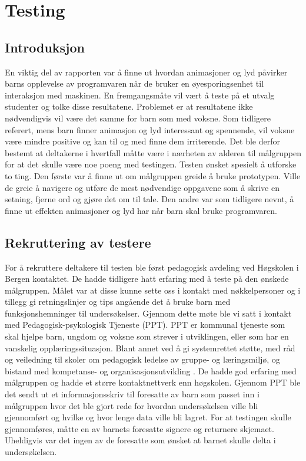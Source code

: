  
 
\chapter{Testing} 
 
\section{Introduksjon} 
 
En viktig del av rapporten var å finne ut hvordan animasjoner og lyd påvirker barns opplevelse av programvaren når de bruker en øyesporingsenhet til interaksjon med maskinen. En fremgangsmåte vil vært å teste på et utvalg studenter og tolke disse resultatene. Problemet er at resultatene ikke nødvendigvis vil være det samme for barn som med voksne. Som tidligere referert, mens barn finner animasjon og lyd interessant og spennende, vil voksne være mindre positive og kan til og med finne dem irriterende. Det ble derfor bestemt at deltakerne i  hvertfall måtte være i nærheten av alderen til målgruppen for at det skulle være noe poeng med testingen. Testen ønsket spesielt å utforske to ting. Den første var å finne ut om målgruppen greide å bruke prototypen. Ville de greie å navigere og utføre de mest nødvendige oppgavene som å skrive en setning, fjerne ord og gjøre det om til tale. Den andre var som tidligere nevnt, å finne ut effekten animasjoner og lyd har når barn skal bruke programvaren.  
 

\section{Rekruttering av testere} 
 
 
For å rekruttere deltakere til testen ble først pedagogisk avdeling ved Høgskolen i Bergen kontaktet. De hadde tidligere hatt erfaring med å teste på den ønskede målgruppen. Målet var at disse kunne sette oss i kontakt med nøkkelpersoner og i tillegg gi retningslinjer og tips angående det å bruke barn med funksjonshemninger til undersøkelser. Gjennom dette møte ble vi satt i kontakt med Pedagogisk-psykologisk Tjeneste (PPT). PPT er kommunal tjeneste som skal hjelpe barn, ungdom og voksne som strever i utviklingen, eller som har en vanskelig opplæringssituasjon. Blant annet ved å gi systemrettet støtte, med råd og veiledning til skoler om pedagogisk ledelse av gruppe- og læringsmiljø, og bistand med kompetanse- og organisasjonsutvikling \cite{Udir.5:online}. De hadde god erfaring med målgruppen og hadde et større kontaktnettverk enn høgskolen. Gjennom PPT ble det sendt ut et informasjonsskriv til foresatte av barn som passet inn i målgruppen hvor det ble gjort rede for hvordan undersøkelsen ville bli gjennomført og hvilke og hvor lenge data ville bli lagret. For at testingen skulle gjennomføres, måtte en av barnets foresatte signere og returnere skjemaet. Uheldigvis var det ingen av de foresatte som ønsket at barnet skulle delta i undersøkelsen. 


